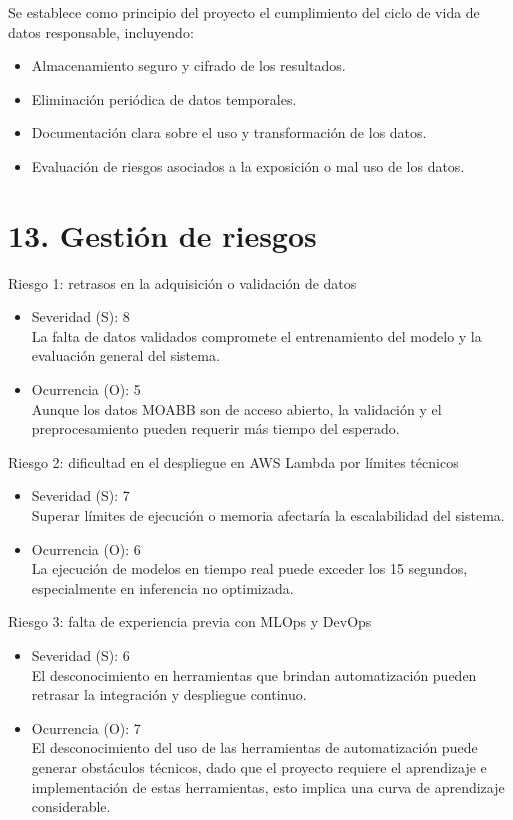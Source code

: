 \documentclass[
11pt, %
]{charter}
\begin{document}
Se establece como principio del proyecto el cumplimiento del ciclo de vida de datos responsable, incluyendo:
\begin{itemize}
  \item Almacenamiento seguro y cifrado de los resultados.
  \item Eliminación periódica de datos temporales.
  \item Documentación clara sobre el uso y transformación de los datos.
  \item Evaluación de riesgos asociados a la exposición o mal uso de los datos.
\end{itemize}


\section{13. Gestión de riesgos}
\label{sec:riesgos}

Riesgo 1: retrasos en la adquisición o validación de datos
\begin{itemize}
    \item Severidad (S): 8 \\
    La falta de datos validados compromete el entrenamiento del modelo y la evaluación general del sistema.
    \item Ocurrencia (O): 5 \\
    Aunque los datos MOABB son de acceso abierto, la validación y el preprocesamiento pueden requerir más tiempo del esperado.
\end{itemize}

Riesgo 2: dificultad en el despliegue en AWS Lambda por límites técnicos
\begin{itemize}
    \item Severidad (S): 7 \\
    Superar límites de ejecución o memoria afectaría la escalabilidad del sistema.
    \item Ocurrencia (O): 6 \\
    La ejecución de modelos en tiempo real puede exceder los 15 segundos, especialmente en inferencia no optimizada.
\end{itemize}

Riesgo 3: falta de experiencia previa con MLOps y DevOps
\begin{itemize}
    \item Severidad (S): 6 \\
    El desconocimiento en herramientas que brindan automatización pueden retrasar la integración y despliegue continuo.
    
    \item Ocurrencia (O): 7 \\
    El desconocimiento del uso de las herramientas de automatización puede generar obstáculos técnicos, dado que el proyecto requiere el aprendizaje e implementación de estas herramientas, esto implica una curva de aprendizaje considerable.
\end{itemize}
\end{document}
